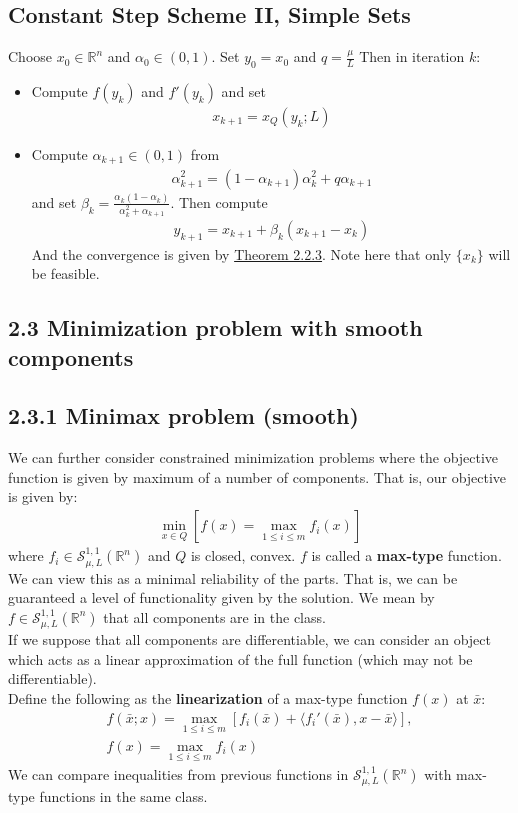 \documentclass[12pt,a4paper]{article}
\begin{document}
	\subsection*{Constant Step Scheme II, Simple Sets}\label{gradoptss}
	 Choose $x_0 \in \mathbb{R}^n$ and $\alpha_0 \in (0,1)$. Set $y_0 = x_0$ and $q = \frac{\mu}{L}$ Then in iteration $k$:
	 \begin{itemize}
	 	\item Compute $f(y_k)$ and $f'(y_k)$ and set
	 	\begin{align*}
	 		x_{k+1} = x_Q(y_k;L)
	 	\end{align*}
	 	\item Compute $\alpha_{k+1} \in (0,1)$ from
	 	\begin{align*}
	 		\alpha_{k+1}^2 = (1 - \alpha_{k+1})\alpha_k^2 + q\alpha_{k+1}
	 	\end{align*}
	 	and set $\beta_k = \frac{\alpha_k(1 - \alpha_k)}{\alpha_k^2 + \alpha_{k+1}}$. Then compute
	 	\begin{align*}
	 		y_{k+1} = x_{k+1} + \beta_k(x_{k+1} - x_k)
	 	\end{align*}
	 	And the convergence is given by \hyperref[thm223]{Theorem 2.2.3}. Note here that only $\{x_k\}$ will be feasible.
	 \end{itemize}
	 \subsection*{2.3 Minimization problem with smooth components}\label{sec:23}
	 \subsection*{2.3.1 Minimax problem (smooth) }\label{minimax23}
	 We can further consider constrained minimization problems where the objective function is given by maximum of a number of components. That is, our objective is given by:
	 \begin{align*}
	 	\min_{x \in Q}[f(x) = \max_{1 \leq i \leq m}f_i(x)]
	 \end{align*}
	 where $f_i \in \mathcal{S}_{\mu,L}^{1,1}(\mathbb{R}^n)$ and $Q$ is closed, convex. $f$ is called a \textbf{max-type} function.  We can view this as a minimal reliability of the parts. That is, we can be guaranteed a level of functionality given by the solution. We mean by $f \in \mathcal{S}_{\mu,L}^{1,1}(\mathbb{R}^n)$ that all components are in the class. \\
	 If we suppose that all components are differentiable, we can consider an object which acts as a linear approximation of the full function (which may not be differentiable).\\
	 Define the following as the \textbf{linearization} of a max-type function $f(x)$ at $\bar{x}$:
	 \begin{align*}
	 	f(\bar{x};x) = \max_{1 \leq i \leq m}[f_i(\bar{x}) + \langle f_i'(\bar{x}), x - \bar{x} \rangle ], \\
	 	f(x) = \max_{1 \leq i \leq m}f_i(x)
	 \end{align*}
	 We can compare inequalities from previous functions in $\mathcal{S}_{\mu,L}^{1,1}(\mathbb{R}^n)$ with max-type functions in the same class.
\end{document}
